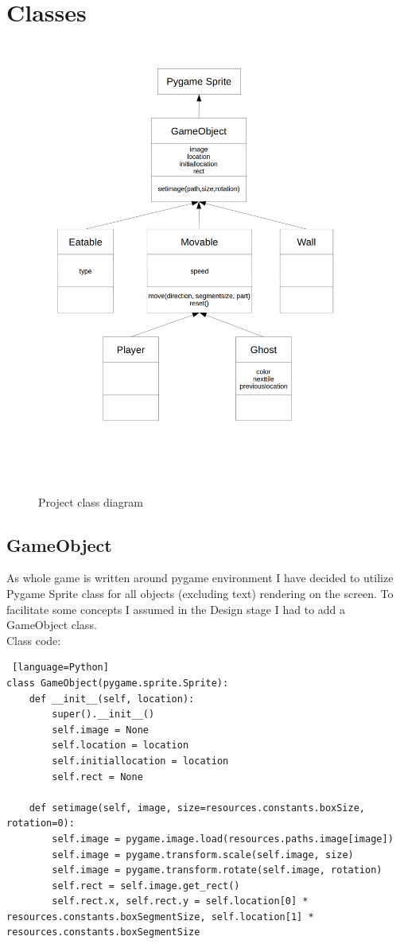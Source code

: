 \documentclass[11pt,a4paper,notitlepage]{report}
\newcommand{\dsubsection}[1]{\FloatBarrier \subsection{#1}}
\newenvironment{img}{
	\begin{center}
		\begin{figure}[H]
			\begin{center}
			
}{
	\end{center}
		\end{figure}
			\end{center}
}
\begin{document}
		\section{Classes}
		\label{classes}
			\begin{img}
				\includegraphics[width=400pt]{images/class_diagram}\\
				\caption{Project class diagram}
			\end{img}
			\dsubsection{GameObject}
				As whole game is written around pygame environment I have decided to utilize Pygame Sprite class for all objects (excluding text) rendering on the screen. To facilitate some concepts I assumed in the Design stage I had to add a GameObject class.\\
				Class code:
				\begin{lstlisting} [language=Python]
class GameObject(pygame.sprite.Sprite):
	def __init__(self, location):
		super().__init__()
		self.image = None
		self.location = location
		self.initiallocation = location
		self.rect = None

	def setimage(self, image, size=resources.constants.boxSize, rotation=0):
		self.image = pygame.image.load(resources.paths.image[image])
		self.image = pygame.transform.scale(self.image, size)
		self.image = pygame.transform.rotate(self.image, rotation)
		self.rect = self.image.get_rect()
		self.rect.x, self.rect.y = self.location[0] * resources.constants.boxSegmentSize, self.location[1] * resources.constants.boxSegmentSize
				\end{lstlisting}
\end{document}
